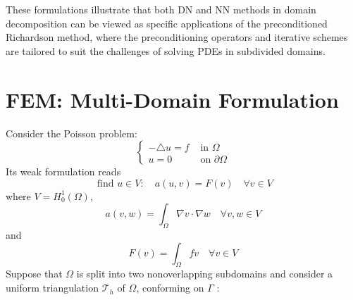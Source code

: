 \documentclass[11pt]{book}
\begin{document}
These formulations illustrate that both DN and NN methods in domain decomposition can be viewed as specific applications of the preconditioned Richardson method, where the preconditioning operators and iterative schemes are tailored to suit the challenges of solving PDEs in subdivided domains.

\section{FEM: Multi-Domain Formulation}
Consider the Poisson problem:
$$
\left\{\begin{aligned}
-\triangle u=f & \text { in } \Omega \\
u=0 & \text { on } \partial \Omega
\end{aligned}\right.
$$
Its weak formulation reads
$$
\text { find } u \in V: \quad a(u, v)=F(v) \quad \forall v \in V
$$
where $V=H_{0}^{1}(\Omega)$,
$$
a(v, w)=\int_{\Omega} \nabla v \cdot \nabla w \quad \forall v, w \in V
$$
and
$$
F(v)=\int_{\Omega} f v \quad \forall v \in V
$$
Suppose that $\Omega$ is split into two nonoverlapping subdomains and consider a uniform triangulation $\mathcal{T}_{h}$ of $\Omega$, conforming on $\Gamma$ :
\end{document}
